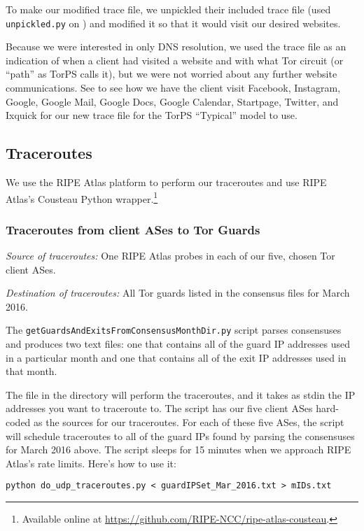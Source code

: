 \documentclass{article}
\begin{document}
To make our modified trace file, we unpickled their included trace file
(used {\tt unpickled.py} on ) and
modified it so that it would visit our desired websites.

Because we were interested in only DNS resolution, we used the trace file as an
indication of when a client had visited a website and with what Tor circuit
(or ``path'' as TorPS calls it), but we were not worried about any further
website communications.
See  to see how we have the
client visit Facebook, Instagram, Google, Google Mail, Google Docs,
Google Calendar, Startpage, Twitter, and Ixquick for our new trace
file for the TorPS ``Typical'' model to use.

\subsection{Traceroutes}
We use the RIPE Atlas platform to perform our traceroutes and use RIPE
Atlas's Cousteau Python wrapper.\footnote{Available online at
\url{https://github.com/RIPE-NCC/ripe-atlas-cousteau}.}

\subsubsection{Traceroutes from client ASes to Tor Guards}
\emph{Source of traceroutes:} One RIPE Atlas probes in each of our five, chosen
Tor client ASes.

\emph{Destination of traceroutes:} All Tor guards listed in the consensus
files for March 2016.

The {\tt getGuardsAndExitsFromConsensusMonthDir.py} script parses consensuses
and produces two text files: one that contains all of the guard IP addresses
used in a particular month and one that contains all of the exit IP addresses
used in that month.

The  file in the directory
will perform the traceroutes, and
it takes as stdin the IP addresses you want to traceroute to. The script has
our five client ASes hard-coded as the sources for our traceroutes. For each
of these five ASes, the script will schedule traceroutes to all of the guard IPs
found by parsing the consensuses for March 2016 above. The script sleeps for
15 minutes when we approach RIPE Atlas's rate limits. Here's how to use it:
\begin{lstlisting}
python do_udp_traceroutes.py < guardIPSet_Mar_2016.txt > mIDs.txt
\end{lstlisting}
\end{document}

